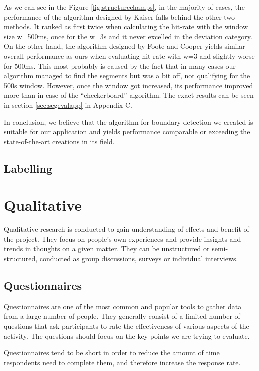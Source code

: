 As we can see in the Figure \ref{fig:structurechamps}, in the majority of cases, the performance of the algorithm designed by Kaiser falls behind the other two methods. It ranked as first twice when calculating the hit-rate with the window size w=500ms, once for the w=3s and it never excelled in the deviation category. On the other hand, the algorithm designed by Foote and Cooper yields similar overall performance as ours when evaluating hit-rate with w=3 and slightly worse for 500ms. This most probably is caused by the fact that in many cases our algorithm managed to find the segments but was a bit off, not qualifying for the 500s window. However, once the window got increased, its performance improved more than in case of the ``checkerboard'' algorithm. The exact results can be seen in section \ref{sec:segevalapp} in Appendix C. 

In conclusion, we believe that the algorithm for boundary detection we created is suitable for our application and yields performance comparable or exceeding the state-of-the-art creations in its field. 

\subsection{Labelling}


\section{Qualitative}
Qualitative research is conducted to gain understanding of effects and benefit of the project. They focus on people's own experiences and provide insights and trends in thoughts on a given matter. They can be unstructured or semi-structured, conducted as group discussions, surveys or individual interviews.



\subsection{Questionnaires}
Questionnaires are one of the most common and popular tools to gather data from a large number of people. They generally consist of a limited number of questions that ask participants to rate the effectiveness of various aspects of the activity. The questions should focus on the key points we are trying to evaluate. 

Questionnaires tend to be short in order to reduce the amount of time respondents need to complete them, and therefore increase the response rate. 

